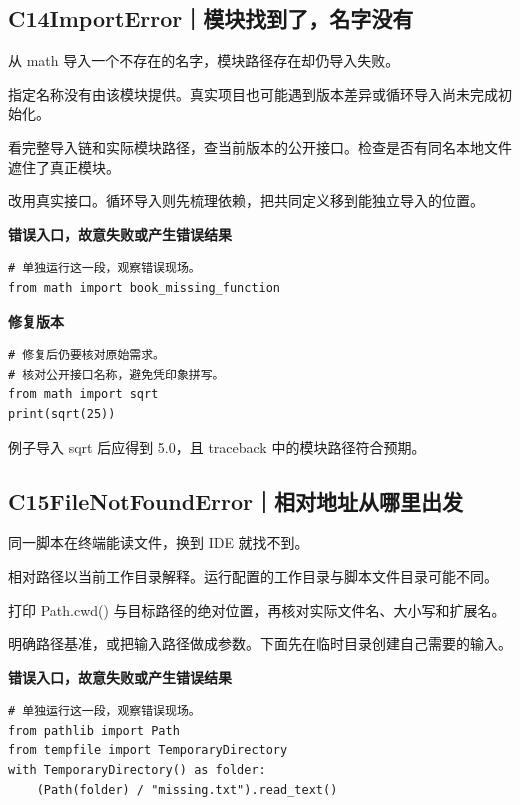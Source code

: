 \documentclass[UTF8,a4paper,oneside,openany,fontset=none,11pt]{ctexbook}
\newcommand{\code}[1]{\texttt{\detokenize{#1}}}
\newcommand{\CaseStep}[2]{\par\smallskip{\bfseries\color{Muted}#1}\enspace #2\par}
\begin{document}
\subsection*{C14\enspace ImportError｜模块找到了，名字没有}

\CaseStep{现象}{从 math 导入一个不存在的名字，模块路径存在却仍导入失败。}

\CaseStep{原因}{指定名称没有由该模块提供。真实项目也可能遇到版本差异或循环导入尚未完成初始化。}

\CaseStep{排查}{看完整导入链和实际模块路径，查当前版本的公开接口。检查是否有同名本地文件遮住了真正模块。}

\CaseStep{修复}{改用真实接口。循环导入则先梳理依赖，把共同定义移到能独立导入的位置。}

\textbf{错误入口，故意失败或产生错误结果}

\begin{lstlisting}[style=errorcode,title={错误复现（故意失败或错误结果）：\code{case_14_bad.py.txt}}]
# 单独运行这一段，观察错误现场。
from math import book_missing_function
\end{lstlisting}

\textbf{修复版本}

\begin{lstlisting}[title={\code{case_14.py}}]
# 修复后仍要核对原始需求。
# 核对公开接口名称，避免凭印象拼写。
from math import sqrt
print(sqrt(25))
\end{lstlisting}

\CaseStep{复验}{例子导入 sqrt 后应得到 5.0，且 traceback 中的模块路径符合预期。}

\subsection*{C15\enspace FileNotFoundError｜相对地址从哪里出发}

\CaseStep{现象}{同一脚本在终端能读文件，换到 IDE 就找不到。}

\CaseStep{原因}{相对路径以当前工作目录解释。运行配置的工作目录与脚本文件目录可能不同。}

\CaseStep{排查}{打印 Path.cwd() 与目标路径的绝对位置，再核对实际文件名、大小写和扩展名。}

\CaseStep{修复}{明确路径基准，或把输入路径做成参数。下面先在临时目录创建自己需要的输入。}

\textbf{错误入口，故意失败或产生错误结果}

\begin{lstlisting}[style=errorcode,title={错误复现（故意失败或错误结果）：\code{case_15_bad.py.txt}}]
# 单独运行这一段，观察错误现场。
from pathlib import Path
from tempfile import TemporaryDirectory
with TemporaryDirectory() as folder:
    (Path(folder) / "missing.txt").read_text()
\end{lstlisting}
\end{document}
